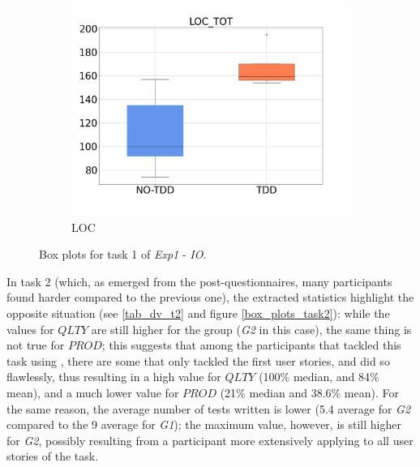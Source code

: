 \begin{figure}[H]
\begin{subfigure}{0.33\textwidth}
        \includegraphics[width=\linewidth]{figures/box_plots/task1/LOC.png}
        \caption{LOC}
        \label{bp_task1_loc}
    \end{subfigure}
    \caption{Box plots for task 1 of \textit{Exp1} - \textit{IO}.}
    \label{box_plots_task1}
\end{figure}

In task 2 (which, as emerged from the post-questionnaires, many participants found harder compared to the previous one), the extracted statistics highlight the opposite situation (see \ref{tab_dv_t2} and figure \ref{box_plots_task2}): while the values for $QLTY$ are still higher for the \tdd group (\textit{G2} in this case), the same thing is not true for $PROD$; this suggests that among the participants that tackled this task using \tdd, there are some that only tackled the first user stories, and did so flawlessly, thus resulting in a high value for $QLTY$ (100\% median, and 84\% mean), and a much lower value for $PROD$ (21\% median and 38.6\% mean). 
For the same reason, the average number of tests written is lower (5.4 average for \textit{G2} compared to the 9 average for \textit{G1}); the maximum value, however, is still higher for \textit{G2}, possibly resulting from a participant more extensively applying \tdd to all user stories of the task.


